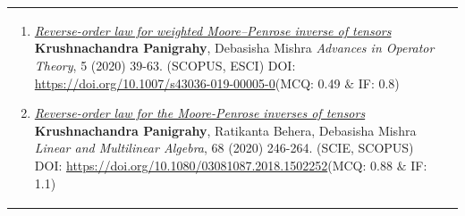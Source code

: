 \documentclass[a4paper,12pt]{article}
\begin{document}
\begin{longtable}{lp{15cm}}
\begin{enumerate}[resume=pubs]
\item \href{https://doi.org/10.1007/s43036-019-00005-0}{\it Reverse-order law for weighted Moore–Penrose inverse of tensors}\newline
{\footnotesize
{\bf Krushnachandra Panigrahy},  Debasisha Mishra\newline
\textcolor{source}{\it Advances in Operator Theory},  5 (2020) 39-63. \hfill{(SCOPUS, ESCI)}\newline
DOI: \href{https://doi.org/10.1007/s43036-019-00005-0}{https://doi.org/10.1007/s43036-019-00005-0}\hfill(MCQ: 0.49 $\&$ IF: 0.8)
}

\item \href{https://doi.org/10.1080/03081087.2018.1502252}{\it Reverse-order law for the Moore-Penrose inverses of tensors}\newline
{\footnotesize 
{\bf Krushnachandra Panigrahy}, Ratikanta Behera,  Debasisha Mishra\newline
\textcolor{source}{\it Linear and Multilinear Algebra},
68 (2020) 246-264. \hfill{(SCIE, SCOPUS)}\newline
DOI: \href{https://doi.org/10.1080/03081087.2018.1502252}{https://doi.org/10.1080/03081087.2018.1502252}\hfill(MCQ: 0.88 $\&$ IF: 1.1)
}
\end{enumerate}\\

\end{longtable}
\end{document}
